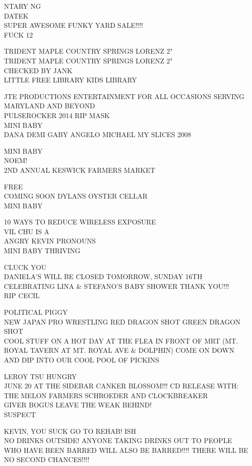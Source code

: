 \documentclass[10pt,letterpaper]{article}
\begin{document}
NTARY NG\\
DATEK\\
SUPER AWESOME FUNKY YARD SALE!!!!\\
FUCK 12

TRIDENT MAPLE COUNTRY SPRINGS LORENZ 2"\\
TRIDENT MAPLE COUNTRY SPRINGS LORENZ 2"\\
CHECKED BY JANK\\
LITTLE FREE LIBRARY KIDS LIBRARY

JTE PRODUCTIONS ENTERTAINMENT FOR ALL OCCASIONS SERVING MARYLAND AND BEYOND\\
PULSEROCKER 2014 RIP MASK\\
MINI BABY\\
DANA DEMI GABY ANGELO MICHAEL MY SLICES 2008

MINI BABY\\
NOEM!\\
2ND ANNUAL KESWICK FARMERS MARKET

FREE\\
COMING SOON DYLANS OYSTER CELLAR\\
MINI BABY

10 WAYS TO REDUCE WIRELESS EXPOSURE\\
VIL CHU IS A\\
ANGRY KEVIN PRONOUNS\\
MINI BABY THRIVING

CLUCK YOU\\
DANIELA'S WILL BE CLOSED TOMORROW, SUNDAY 16TH CELEBRATING LINA \& STEFANO'S BABY SHOWER THANK YOU!!!\\
RIP CECIL

POLITICAL PIGGY\\
NEW JAPAN PRO WRESTLING RED DRAGON SHOT GREEN DRAGON SHOT\\
COOL STUFF ON A HOT DAY AT THE FLEA IN FRONT OF MRT (MT. ROYAL TAVERN AT MT. ROYAL AVE \& DOLPHIN) COME ON DOWN AND DIP INTO OUR COOL POOL OF PICKINS

LEROY TSU HUNGRY\\
JUNE 20 AT THE SIDEBAR CANKER BLOSSOM!!! CD RELEASE WITH: THE MELON FARMERS SCHROEDER AND CLOCKBREAKER\\
GIVER BOGUS LEAVE THE WEAK BEHIND!\\
SUSPECT

KEVIN, YOU SUCK GO TO REHAB! ISH\\
NO DRINKS OUTSIDE!  ANYONE TAKING DRINKS OUT TO PEOPLE WHO HAVE BEEN BARRED WILL ALSO BE BARRED!!!! THERE WILL BE NO SECOND CHANCES!!!!
\end{document}
